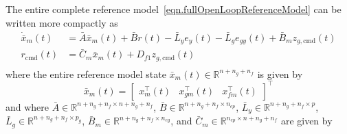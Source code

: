 The entire complete reference model\ \eqref{eqn.fullOpenLoopReferenceModel} can be written more compactly as
\begin{equation}
  \label{eqn.xbareqnopenloop}
  \begin{split}
    \dot{\bar{x}}_{m}(t) &= \bar{A}\bar{x}_{m}(t) + \bar{B}r(t) - \bar{L}_{y}e_{y}(t) - \bar{L}_{g}e_{gy}(t) + \bar{B}_{m}z_{g,\text{cmd}}(t) \\
    r_{\text{cmd}}(t) &= \bar{C}_{m}\bar{x}_{m}(t) + D_{f1}z_{g,\text{cmd}}(t) \\
  \end{split}
\end{equation}
where the entire reference model state $\bar{x}_{m}(t)\in\mathbb{R}^{n+n_{g}+n_{f}}$ is given by
\begin{equation*}
  \bar{x}_{m}(t) =
  \begin{bmatrix}
    x_{m}^{\top}(t) & x_{gm}^{\top}(t) & x_{fm}^{\top}(t)
  \end{bmatrix}^{\top}
\end{equation*}
and where $\bar{A}\in\mathbb{R}^{n+n_{g}+n_{f}\times n+n_{g}+n_{f}}$, $\bar{B}\in\mathbb{R}^{n+n_{g}+n_{f}\times n_{ep}}$, $\bar{L}_{y}\in\mathbb{R}^{n+n_{g}+n_{f}\times p}$, $\bar{L}_{g}\in\mathbb{R}^{n+n_{g}+n_{f}\times p_{g}}$, $\bar{B}_{m}\in\mathbb{R}^{n+n_{g}+n_{f}\times n_{eg}}$, and $\bar{C}_{m}\in\mathbb{R}^{n_{ep} \times n+n_{g}+n_{f}}$ are given by

